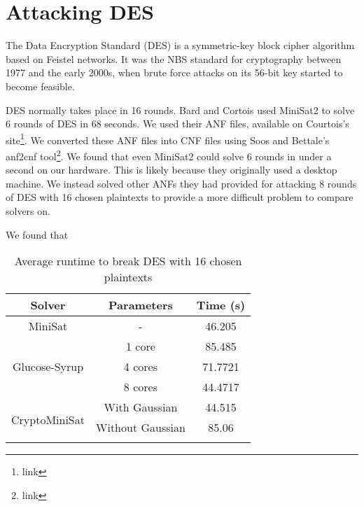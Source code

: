 \section{Attacking DES}
The Data Encryption Standard (DES) is a symmetric-key block cipher algorithm based on Feistel networks. It was the NBS standard for cryptography between 1977 and the early 2000s, when brute force attacks on its 56-bit key started to become feasible.\cite{find appropriate citation}

DES normally takes place in 16 rounds. Bard and Cortois\cite{citation} used MiniSat2 to solve 6 rounds of DES in 68 seconds. We used their ANF files, available on Courtois's site\footnote{link}. We converted these ANF files into CNF files using Soos and Bettale's anf2cnf tool\footnote{link}. We found that even MiniSat2 could solve 6 rounds in under a second on our hardware. This is likely because they originally used a desktop machine. We instead solved other ANFs they had provided for attacking 8 rounds of DES with 16 chosen plaintexts to provide a more difficult problem to compare solvers on.

We found that 

\begin{table}[!htbp]
	\centering
	\begin{tabular}{|c|c|c|}
		\hline
		\textbf{Solver} & \textbf{Parameters} & \textbf{Time (s)} \\
		\hline
		MiniSat & - & 46.205 \\
		\hline
		\multirow{3}{*}{Glucose-Syrup} & 1 core & 85.485 \\ \cline{2-3}
		& 4 cores & 71.7721 \\ \cline{2-3}
		& 8 cores & 44.4717 \\
		\hline
		
		\multirow{3}{*}{CryptoMiniSat} & With Gaussian & 44.515 \\ \cline{2-3} 
		& Without Gaussian & 85.06 \\ \cline{2-3} 
		\hline
	\end{tabular}
	
	\caption{Average runtime to break DES with 16 chosen plaintexts}
	\label{table:des:runtime}
\end{table}